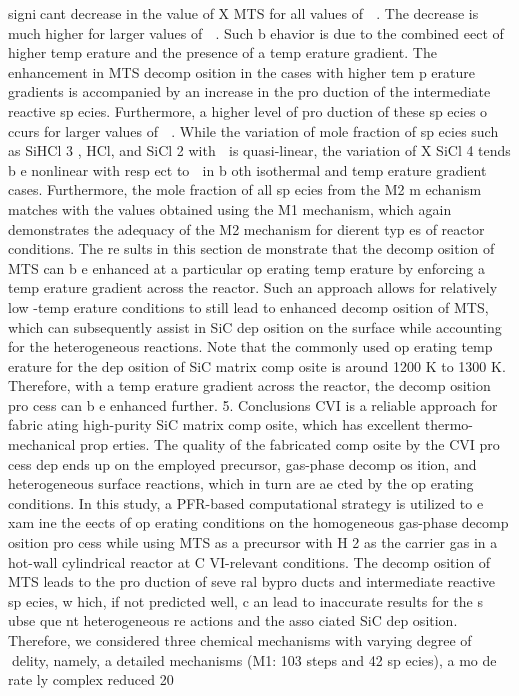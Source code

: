 \documentclass[10pt, letterpaper]{article}
\begin{document}
signicant decrease in the value of
X
MTS
for all values of

. The decrease is much higher for larger values of

.
Such b ehavior is due to the combined eect of higher temp erature and the presence of a temp erature gradient.
The enhancement in MTS decomp osition in the cases with higher tem p erature gradients is accompanied by
an increase in the pro duction of the intermediate reactive sp ecies. Furthermore, a higher level of pro duction
of these sp ecies o ccurs for larger values of

. While the variation of mole fraction of sp ecies such as SiHCl
3
,
HCl, and SiCl
2
with

is quasi-linear, the variation of
X
SiCl
4
tends b e nonlinear with resp ect to

in
b oth isothermal and temp erature gradient cases. Furthermore, the mole fraction of all sp ecies from the
M2 m echanism matches with the values obtained using the M1 mechanism, which again demonstrates the
adequacy of the M2 mechanism for dierent typ es of reactor conditions.
The re sults in this section de monstrate that the decomp osition of MTS can b e enhanced at a particular
op erating temp erature by enforcing a temp erature gradient across the reactor. Such an approach allows for
relatively low -temp erature conditions to still lead to enhanced decomp osition of MTS, which can subsequently
assist in SiC dep osition on the surface while accounting for the heterogeneous reactions. Note that the
commonly used op erating temp erature for the dep osition of SiC matrix comp osite is around 1200 K to 1300
K. Therefore, with a temp erature gradient across the reactor, the decomp osition pro cess can b e enhanced
further.
5. Conclusions
CVI is a reliable approach for fabric ating high-purity SiC matrix comp osite, which has excellent thermo-
mechanical prop erties. The quality of the fabricated comp osite by the CVI pro cess dep ends up on the
employed precursor, gas-phase decomp os ition, and heterogeneous surface reactions, which in turn are ae cted
by the op erating conditions. In this study, a PFR-based computational strategy is utilized to e xam ine the
eects of op erating conditions on the homogeneous gas-phase decomp osition pro cess while using MTS as a
precursor with H
2
as the carrier gas in a hot-wall cylindrical reactor at C VI-relevant conditions.
The decomp osition of MTS leads to the pro duction of seve ral bypro ducts and intermediate reactive
sp ecies, w hich, if not predicted well, c an lead to inaccurate results for the s ubse que nt heterogeneous re actions
and the asso ciated SiC dep osition. Therefore, we considered three chemical mechanisms with varying degree
of delity, namely, a detailed mechanisms (M1: 103 steps and 42 sp ecies), a mo de rate ly complex reduced
20
\end{document}
